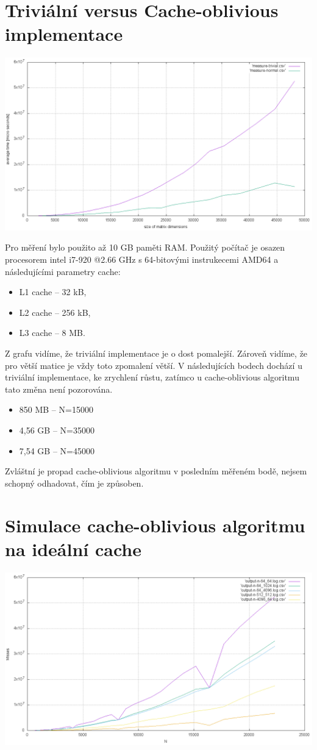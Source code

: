 \documentclass[12pt,a4paper]{report}
\begin{document}
\section{Triviální versus Cache-oblivious implementace}
\includegraphics[width=\textwidth]{./tests/graph1.png}

Pro měření bylo použito až 10 GB paměti RAM.
Použitý počítač je osazen procesorem intel i7-920 @2.66 GHz
s 64-bitovými instrukecemi AMD64 a následujícími parametry cache:
\begin{itemize}
	\item L1 cache -- 32 kB,
	\item L2 cache -- 256 kB,
	\item L3 cache -- 8 MB.
\end{itemize}

Z grafu vidíme, že triviální implementace je o dost pomalejší.
Zároveň vidíme, že pro větší matice je vždy toto zpomalení větší.
V následujících bodech dochází u triviální implementace, ke zrychlení
růstu, zatímco u cache-oblivious algoritmu tato změna není pozorována.
\begin{itemize}
\item 850 MB  -- N=15000
\item 4,56 GB -- N=35000
\item 7,54 GB -- N=45000
\end{itemize}

Zvláštní je propad cache-oblivious algoritmu v posledním měřeném bodě, nejsem schopný
odhadovat, čím je způsoben.

\section{Simulace cache-oblivious algoritmu na ideální cache}
\includegraphics[width=\textwidth]{./tests/graph2.png}
\end{document}
